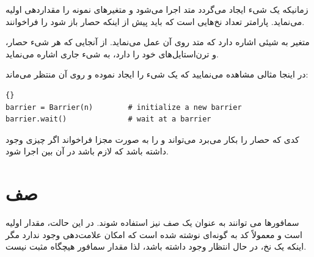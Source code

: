 \documentclass{book}
\begin{document}
    زمانیکه یک شیء  ایجاد می‌گردد 
    متد  اجرا می‌شود و متغیرهای نمونه را مقداردهی اولیه می‌نماید. 
    پارامتر  تعداد نخ‌هایی است که باید پیش از اینکه حصار باز شود   را فراخوانند. 
    

    متغیر  به شیئی اشاره دارد که متد روی آن عمل می‌نماید. 
    از آنجایی که هر شیء حصار،  و ترن‌استایل‌های خود را دارد،  به  شیء جاری اشاره می‌نماید. 

    در اینجا مثالی مشاهده می‌نمایید که یک شیء  را ایجاد نموده و روی آن منتظر می‌ماند:

\begin{latin}
\begin{latin}
\begin{lstlisting}[title={Barrier \rl{واسط}}]{}
barrier = Barrier(n)        # initialize a new barrier
barrier.wait()              # wait at a barrier
\end{lstlisting}
\end{latin}
\end{latin}

        کدی که حصار را بکار می‌برد می‌تواند  و  را به صورت مجزا فراخواند
        اگر چیزی وجود داشته باشد که لازم باشد در آن بین اجرا شود. 



\section{صف}
\label{dancers}

    سمافور‌ها می توانند به عنوان یک صف نیز استفاده شوند. 
    در این حالت، مقدار اولیه  است
    و معمولاً کد به گونه‌ای  نوشته شده است که امکان علامت‌دهی وجود ندارد 
    مگر اینکه یک نخ، در حال انتظار وجود داشته باشد، لذا مقدار سمافور هیچگاه مثبت نیست.
\end{document}
